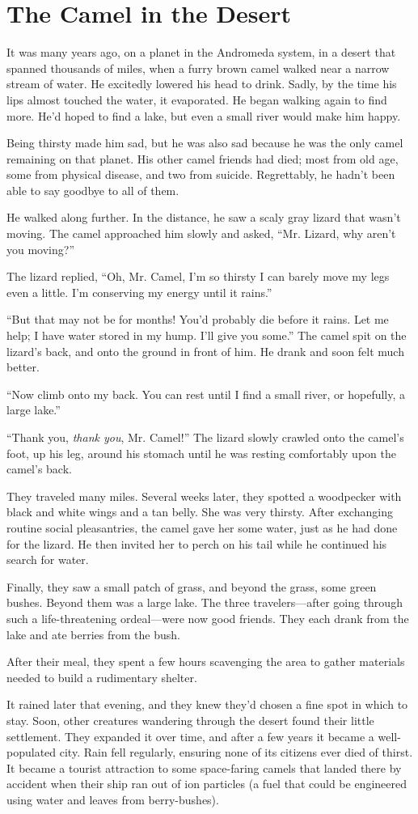 \chapter{The Camel in the Desert}

It was many years ago, on a planet in the Andromeda system, in a desert that spanned thousands of miles, when a furry brown camel walked near a narrow stream of water. He excitedly lowered his head to drink. Sadly, by the time his lips almost touched the water, it evaporated. He began walking again to find more. He'd hoped to find a lake, but even a small river would make him happy.

Being thirsty made him sad, but he was also sad because he was the only camel remaining on that planet. His other camel friends had died; most from old age, some from physical disease, and two from suicide. Regrettably, he hadn't been able to say goodbye to all of them.

He walked along further. In the distance, he saw a scaly gray lizard that wasn't moving. The camel approached him slowly and asked, “Mr. Lizard, why aren't you moving?”

The lizard replied, “Oh, Mr. Camel, I'm so thirsty I can barely move my legs even a little. I'm conserving my energy until it rains.”

“But that may not be for months! You'd probably die before it rains. Let me help; I have water stored in my hump. I'll give you some.” The camel spit on the lizard's back, and onto the ground in front of him. He drank and soon felt much better.

“Now climb onto my back. You can rest until I find a small river, or hopefully, a large lake.”

“Thank you, \textit{thank you}, Mr. Camel!” The lizard slowly crawled onto the camel's foot, up his leg, around his stomach until he was resting comfortably upon the camel's back.

They traveled many miles. Several weeks later, they spotted a woodpecker with black and white wings and a tan belly. She was very thirsty. After exchanging routine social pleasantries, the camel gave her some water, just as he had done for the lizard. He then invited her to perch on his tail while he continued his search for water.

Finally, they saw a small patch of grass, and beyond the grass, some green bushes. Beyond them was a large lake. The three travelers—after going through such a life-threatening ordeal—were now good friends. They each drank from the lake and ate berries from the bush.

After their meal, they spent a few hours scavenging the area to gather materials needed to build a rudimentary shelter.

It rained later that evening, and they knew they'd chosen a fine spot in which to stay. Soon, other creatures wandering through the desert found their little settlement. They expanded it over time, and after a few years it became a well-populated city. Rain fell regularly, ensuring none of its citizens ever died of thirst. It became a tourist attraction to some space-faring camels that landed there by accident when their ship ran out of ion particles (a fuel that could be engineered using water and leaves from berry-bushes).